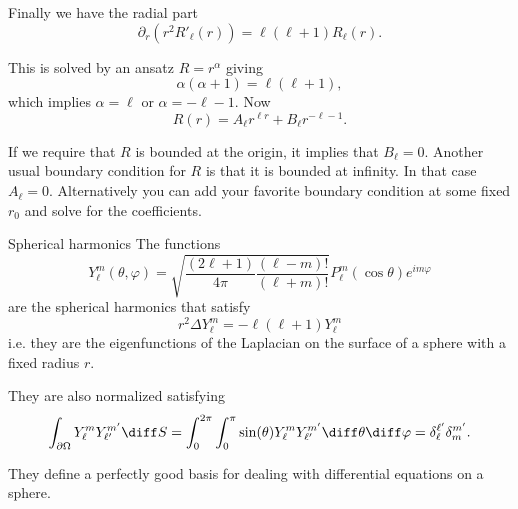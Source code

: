 \begin{frame}
	Finally we have the radial part 
	\[ \partial_r (r^2 R'_\ell (r) ) = \ell(\ell+1) R_\ell (r). \]
	
	\pause
	This is solved by an ansatz $ R = r^{\alpha} $ giving 
	\[ \alpha (\alpha + 1) = \ell (\ell +1 ), \]
	which implies $ \alpha = \ell $ or $ \alpha = -\ell - 1. $ Now
	\[ R(r) = A_{\ell} r^{\ell r} + B_{\ell} r^{-\ell-1}. \]
	
	\pause
	If we require that $ R $ is bounded at the origin, it implies that $ B_{\ell} = 0 $. Another usual boundary condition for $ R $ is that it is bounded at infinity. In that case $ A_{\ell} = 0 $. Alternatively you can add your favorite boundary condition at some fixed $ r_0 $ and solve for the coefficients. 
\end{frame}

\begin{frame}{Spherical harmonics}
	The functions 
	\[ Y_\ell^{m} (\theta,\varphi) = \sqrt{\frac{(2 \ell +1 )}{4\pi} \frac{(\ell -m)!}{(\ell + m)!}} P_\ell^{m} (\cos\theta) e^{im\varphi}   \]
	are the spherical harmonics that satisfy
	\[ r^2 \Delta Y_\ell^{m} = -\ell (\ell + 1) Y_\ell^{m} \]
	i.e. they are the eigenfunctions of the Laplacian on the surface of a sphere with a fixed radius $ r $. 
	
	\pause
	They are also normalized satisfying 
	\[ \int_{\partial \Omega } Y_\ell^{m} Y_{\ell'}^{m'} \diff S = \int_{0}^{2\pi} \int_{0}^{\pi} \sin(\theta) Y_\ell^{m} Y_{\ell'}^{m'} \diff \theta \diff \varphi = \delta_{\ell}^{\ell'} \delta_{m}^{m'}.  \]
	
	\pause
	They define a perfectly good basis for dealing with differential equations on a sphere. 
\end{frame}



